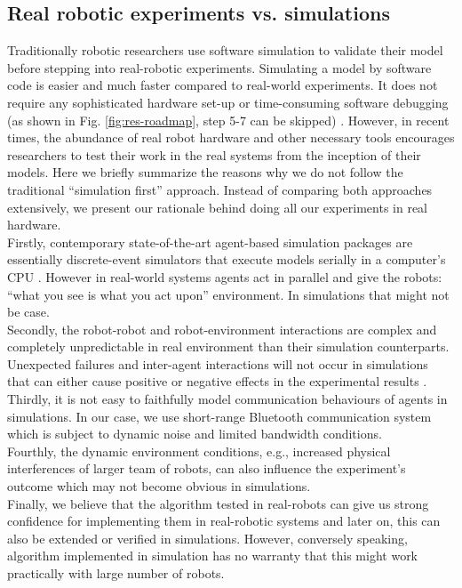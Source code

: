 \subsection{Real robotic experiments vs. simulations}
Traditionally robotic researchers use software simulation to validate their model before stepping into real-robotic experiments. Simulating a model by software code is easier and much faster compared to real-world experiments. It does not require any sophisticated hardware set-up or time-consuming software debugging (as shown in Fig. \ref{fig:res-roadmap},  step 5-7 can be skipped) . However, in recent times, the abundance of real robot hardware and other necessary tools encourages researchers to test their work in the real systems from the inception of their models. Here we briefly summarize the reasons why we do not follow the traditional ``simulation first'' approach. Instead of comparing both approaches extensively, we present our rationale behind doing all our experiments in real hardware.\\
Firstly, contemporary state-of-the-art agent-based simulation packages are essentially discrete-event simulators that execute models serially in a computer's CPU \cite{Lysenko+2008}. However in real-world systems agents act in parallel and give the robots:  ``what you see is what you act upon'' environment. In simulations that might not be case.\\
Secondly, the robot-robot and robot-environment interactions are complex and completely unpredictable in real environment than their simulation counterparts. Unexpected failures and inter-agent interactions will not occur in simulations that can either cause positive or negative effects in the experimental results \cite{Krieger+2000}.\\
Thirdly, it is not easy to faithfully model communication behaviours of agents in simulations. In our case, we use short-range Bluetooth communication system which is subject to dynamic noise and limited bandwidth conditions. \\
Fourthly, the dynamic environment conditions, e.g., increased physical interferences of larger team of robots, can also influence the experiment's outcome which may not become obvious in simulations.\\
Finally, we believe that the algorithm tested in real-robots can give us strong confidence for implementing them in real-robotic systems and later on, this can also be extended or verified in simulations. However, conversely speaking, algorithm implemented in simulation has no warranty that this might work practically with large number of robots.
